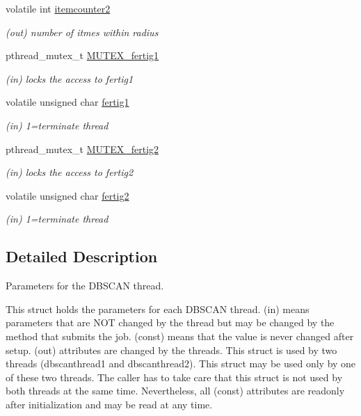 \begin{DoxyCompactItemize}
volatile int \mbox{\hyperlink{structdbscan__pt_a7282c5e97e591646a31c5762bf39bd3f}{itemcounter2}}
\begin{DoxyCompactList}\small\item\em (out) number of itmes within radius \end{DoxyCompactList}\item 
pthread\+\_\+mutex\+\_\+t \mbox{\hyperlink{structdbscan__pt_a9b4bcd3f61e899809341451edb698520}{M\+U\+T\+E\+X\+\_\+fertig1}}
\begin{DoxyCompactList}\small\item\em (in) locks the access to fertig1 \end{DoxyCompactList}\item 
volatile unsigned char \mbox{\hyperlink{structdbscan__pt_a8ce1ed79a8f30b769dbae5a3725d0bec}{fertig1}}
\begin{DoxyCompactList}\small\item\em (in) 1=terminate thread \end{DoxyCompactList}\item 
pthread\+\_\+mutex\+\_\+t \mbox{\hyperlink{structdbscan__pt_ade6e5b96f996f1d367a2595f7c237978}{M\+U\+T\+E\+X\+\_\+fertig2}}
\begin{DoxyCompactList}\small\item\em (in) locks the access to fertig2 \end{DoxyCompactList}\item 
volatile unsigned char \mbox{\hyperlink{structdbscan__pt_a6e02721843281f1f83499d2e7c3ffd32}{fertig2}}
\begin{DoxyCompactList}\small\item\em (in) 1=terminate thread \end{DoxyCompactList}\end{DoxyCompactItemize}


\subsection{Detailed Description}
Parameters for the D\+B\+S\+C\+AN thread. 

This struct holds the parameters for each D\+B\+S\+C\+AN thread. (in) means parameters that are N\+OT changed by the thread but may be changed by the method that submits the job. (const) means that the value is never changed after setup. (out) attributes are changed by the threads. This struct is used by two threads (dbscanthread1 and dbscanthread2). This struct may be used only by one of these two threads. The caller has to take care that this struct is not used by both threads at the same time. Nevertheless, all (const) attributes are readonly after initialization and may be read at any time. 

